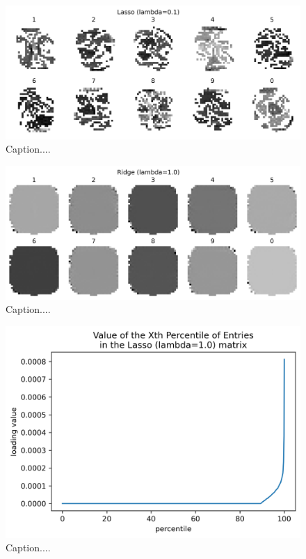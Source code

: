 \documentclass[10pt]{article}
\begin{document}
\begin{figure}[ht]
\centerline{\includegraphics[scale=0.75]{figures/weight_matrix_lasso_01_no_zeros.png}}
\caption{Caption....}
\label{fig12}
\end{figure}

\begin{figure}[ht]
\centerline{\includegraphics[scale=0.75]{figures/weight_matrix_ridge_no_zeros.png}}
\caption{Caption....}
\label{fig13}
\end{figure}

\begin{figure}[ht]
\centerline{\includegraphics[scale=0.9]{figures/lasso_loading_percentiles-see_uptick_at_90.png}}
\caption{Caption....}
\label{fig14}
\end{figure}
\end{document}
